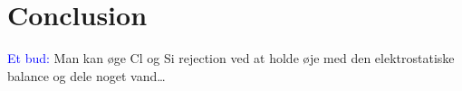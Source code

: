 \chapter{Conclusion}

\textcolor{blue}{Et bud:} Man kan øge Cl og Si rejection ved at holde øje med den elektrostatiske balance og dele noget vand…